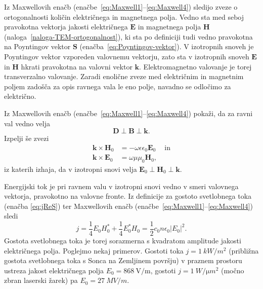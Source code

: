 Iz Maxwellovih enačb (enačbe~\ref{eq:Maxwell1}--\ref{eq:Maxwell4}) sledijo zveze o ortogonalnosti
količin električnega in magnetnega polja. Vedno sta med seboj pravokotna vektorja
jakosti električnega $\mathbf{E}$ in magnetnega polja $\mathbf{H}$ 
(naloga~\ref{naloga-TEM-ortogonalnost}), ki sta po definiciji tudi vedno 
pravokotna na Poyntingov vektor $\mathbf{S}$ (enačba~\ref{eq:Poyntingov-vektor}). V
izotropnih snoveh je Poyntingov vektor vzporeden valovnemu vektorju, zato
sta v izotropnih snoveh $\mathbf{E}$ in $\mathbf{H}$ hkrati pravokotna 
na valovni vektor $\mathbf{k}$. Elektromagnetno valovanje je torej transverzalno valovanje. 
Zaradi enolične zveze med električnim in magnetnim poljem zadošča
za opis ravnega vala le eno polje, navadno se odločimo za električno.

\begin{definition}
\label{naloga-TEM-ortogonalnost}
Iz Maxwellovih enačb (enačbe~\ref{eq:Maxwell1}--\ref{eq:Maxwell4}) pokaži, 
da za ravni val vedno velja 
\begin{equation}
\mathbf{D} \perp \mathbf{B} \perp \mathbf{k}.  
\end{equation}
Izpelji še zvezi
\begin{align}
\mathbf{k}\times\mathbf{H}_{0} & =-\omega\epsilon\epsilon_{0}\mathbf{E}_{0}\label{eq:TEM-pogoj1}\
\quad \mathrm{in}\\
\mathbf{k}\times\mathbf{E}_{0} & =\omega\mu\mu_{0}\mathbf{H}_{0}\label{eq:TEM-pogoj2},
\end{align}
iz katerih izhaja, da v izotropni snovi velja $\mathbf{E}_0\perp \mathbf{H}_0\perp 
\mathbf{k}$.
\end{definition}

Energijski tok je pri ravnem valu v izotropni snovi vedno v smeri valovnega vektorja, pravokotno
na valovne fronte. Iz definicije za gostoto svetlobnega toka (enačba \ref{eq:jReS}) 
ter Maxwellovih enačb (enačbe~\ref{eq:Maxwell1}--\ref{eq:Maxwell4}) 
sledi\index{Gostota energijskega toka}
\begin{equation}
j=\frac{1}{4}E_{0}H_{0}^{*}+\frac{1}{4}E_{0}^*H_{0}=
\frac{1}{2}c_{0}n\epsilon_{0}\left|E_{0}\right|^{2}.
\label{eq:j}
\end{equation}
Gostota svetlobnega toka je torej sorazmerna
s kvadratom amplitude jakosti električnega polja. Poglejmo nekaj primerov.
Gostoti toka $j=1~\si{kW/m^{2}}$
(približna gostota svetlobnega toka s Sonca na Zemljinem površju) v praznem prostoru ustreza 
jakost električnega polja $E_{0}=868~\si{\volt/\meter}$, gostoti $j=1~\si{W/\micro m^{2}}$ 
(močno zbran laserski žarek) pa $E_{0}=27~\si{MV/m}$. 

